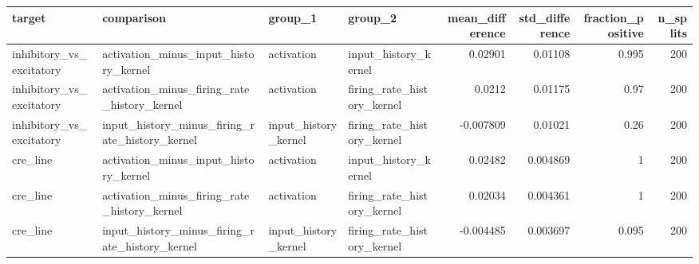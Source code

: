 \begin{tabular}{llllrrrr}
\toprule
target & comparison & group_1 & group_2 & mean_difference & std_difference & fraction_positive & n_splits \\
\midrule
inhibitory_vs_excitatory & activation_minus_input_history_kernel & activation & input_history_kernel & 0.02901 & 0.01108 & 0.995 & 200 \\
inhibitory_vs_excitatory & activation_minus_firing_rate_history_kernel & activation & firing_rate_history_kernel & 0.0212 & 0.01175 & 0.97 & 200 \\
inhibitory_vs_excitatory & input_history_minus_firing_rate_history_kernel & input_history_kernel & firing_rate_history_kernel & -0.007809 & 0.01021 & 0.26 & 200 \\
cre_line & activation_minus_input_history_kernel & activation & input_history_kernel & 0.02482 & 0.004869 & 1 & 200 \\
cre_line & activation_minus_firing_rate_history_kernel & activation & firing_rate_history_kernel & 0.02034 & 0.004361 & 1 & 200 \\
cre_line & input_history_minus_firing_rate_history_kernel & input_history_kernel & firing_rate_history_kernel & -0.004485 & 0.003697 & 0.095 & 200 \\
\bottomrule
\end{tabular}
